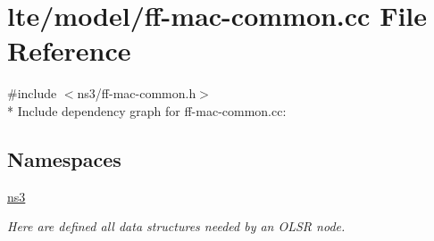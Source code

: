 \hypertarget{ff-mac-common_8cc}{}\section{lte/model/ff-\/mac-\/common.cc File Reference}
\label{ff-mac-common_8cc}
{\ttfamily \#include $<$ns3/ff-\/mac-\/common.\+h$>$}\\*
Include dependency graph for ff-\/mac-\/common.cc\+:
\subsection*{Namespaces}
\begin{DoxyCompactItemize}
\item 
 \hyperlink{namespacens3}{ns3}
\begin{DoxyCompactList}\small\item\em Here are defined all data structures needed by an O\+L\+SR node. \end{DoxyCompactList}\end{DoxyCompactItemize}
